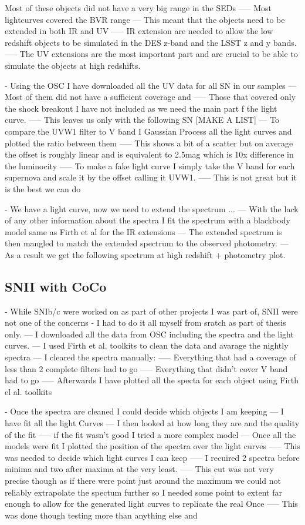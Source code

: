 Most of these objects did not have a very big range in the SEDs
----- Most lightcurves covered the BVR range
--- This meant that the objects need to be extended in both IR and UV
----- IR extension are needed to allow the low redshift objects to be simulated in the DES z-band and the LSST z and y bands.
----- The UV extensions are the most important part and are crucial to be able to simulate the objects at high redshifts.

- Using the OSC I have downloaded all the UV data for all SN in our samples
--- Most of them did not have a sufficient coverage and
----- Those that covered only the shock breakout I have not included as we need the main part f the light curve.
----- This leaves us only with the following SN [MAKE A LIST]
--- To compare the UVW1 filter to V band I Gaussian Process all the light curves and plotted the ratio between them
----- This shows a bit of a scatter but on average the offset is roughly linear and is equivalent to 2.5mag which is 10x difference in the luminocity
----- To make a fake light curve I simply take the V band for each supernova and scale it by the offset calling it UVW1.
----- This is not great but it is the best we can do

- We have a light curve, now we need to extend the spectrum ...
--- With the lack of any other information about the spectra I fit the spectrum with a blackbody model same as Firth et al for the IR extensions
--- The extended spectrum is then mangled to match the extended spectrum to the observed photometry.
--- As a result we get the following spectrum at high redshift + photometry plot.

\subsection{SNII with CoCo}
- While SNIb/c were worked on as part of other projects I was part of, SNII were not one of the concerns
- I had to do it all myself from sratch as part of thesis only.
--- I downloaded all the data from OSC including the spectra and the light curves.
--- I used Firth et al. toolkits to clean the data and avarage the nightly spectra
--- I cleared the spectra manually:
----- Everything that had a coverage of less than 2 complete filters had to go
----- Everything that didn't cover V band had to go
----- Afterwards I have plotted all the specta for each object using Firth el al. toolkits

- Once the spectra are cleaned I could decide which objects I am keeping
--- I have fit all the light Curves
--- I then looked at how long they are and the quality of the fit
----- if the fit wasn't good I tried a more complex model
--- Once all the models were fit I plotted the position of the spectra over the light curves
----- This was needed to decide which light curves I can keep
----- I recuired 2 spectra before minima and two after maxima at the very least.
----- This cut was not very precise though as if there were point just around the maximum we could not reliably extrapolate the spectum further so I needed some point to extent far enough to allow for the generated light curves to replicate the real Once
----- This was done though testing more than anything else and

